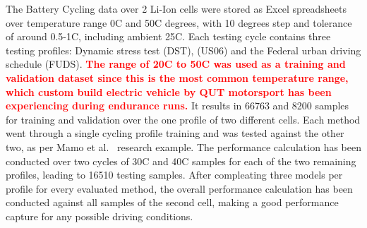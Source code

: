 %
%
The Battery Cycling data over 2 Li-Ion cells were stored as Excel spreadsheets over temperature range 0\textdegree{}C and 50\textdegree{}C degrees, with 10 degrees step and tolerance of around 0.5-1\textdegree{}C, including ambient 25\textdegree{}C.
Each testing cycle contains three testing profiles: Dynamic stress test (DST), (US06) and the Federal urban driving schedule (FUDS).
\textcolor{red}{\textbf{The range of 20\textdegree{}C to 50\textdegree{}C was used as a training and validation dataset since this is the most common temperature range, which custom build electric vehicle by QUT motorsport has been experiencing during endurance runs.}}
It results in 66763 and 8200 samples for training and validation over the one profile of two different cells.
Each method went through a single cycling profile training and was tested against the other two, as per Mamo et al.~\cite{mamo_long_2020} research example.
The performance calculation has been conducted over two cycles of 30\textdegree{}C and 40\textdegree{}C samples for each of the two remaining profiles, leading to 16510 testing samples.
After compleating three models per profile for every evaluated method, the overall performance calculation has been conducted against all samples of the second cell, making a good performance capture for any possible driving conditions.

